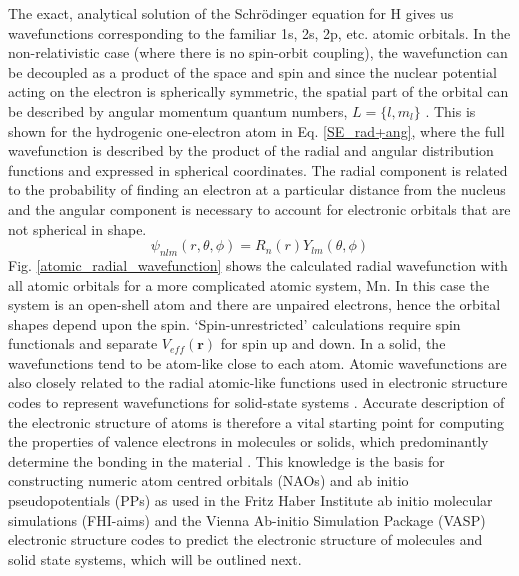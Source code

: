 \documentclass[11pt, twoside]{report}
\begin{document}
The exact, analytical solution of the Schr{\"o}dinger equation for H gives us wavefunctions corresponding to the familiar 1s, 2s, 2p, etc. atomic orbitals. 
In the non-relativistic case (where there is no spin-orbit coupling), the wavefunction can be decoupled as a product of the space and spin and since the nuclear potential acting on the electron is spherically symmetric, the spatial part of the orbital can be described by angular momentum quantum numbers, $L=\{l,m_l\}$ \cite{RichardMartin_Ch10}. This is shown for the hydrogenic one-electron atom in Eq. \ref{SE_rad+ang}, where the full wavefunction is described by the product of the radial and angular distribution functions and expressed in spherical coordinates. The radial component is related to the probability of finding an electron at a particular distance from the nucleus and the angular component is necessary to account for electronic orbitals that are not spherical in shape.
\begin{equation}\label{SE_rad+ang}
\psi_{nlm}(r, \theta, \phi) = R_n(r) Y_{lm}(\theta, \phi)
\end{equation}
Fig. \ref{atomic_radial_wavefunction} shows the calculated radial wavefunction with all atomic orbitals for a more complicated atomic system, Mn. In this case the system is an open-shell atom and there are unpaired electrons, hence the orbital shapes depend upon the spin. `Spin-unrestricted' calculations require spin functionals and separate $V_{eff}(\mathbf{r})$ for spin up and down. 
In a solid, the wavefunctions tend to be atom-like close to each atom. Atomic wavefunctions are also closely related to the radial atomic-like functions used in electronic structure codes to represent wavefunctions for solid-state systems \cite{RichardMartin_Ch10}. Accurate description of the electronic structure of atoms is therefore a vital starting point for computing the properties of valence electrons in molecules or solids, which predominantly determine the bonding in the material \cite{RichardMartin_Ch11}. This knowledge is the basis for constructing numeric atom centred orbitals (NAOs) and ab initio pseudopotentials (PPs) as used in the Fritz Haber Institute ab initio molecular simulations (FHI-aims) \cite{FHI-aims} and the Vienna Ab-initio Simulation Package (VASP) \cite{VASP} electronic structure codes to predict the electronic structure of molecules and solid state systems, which will be outlined next.
\end{document}
